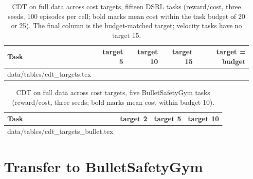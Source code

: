 \documentclass{article} %
\makeatletter
\newcommand{\tabinput}[1]{\@@input#1 }
\makeatother
\begin{document}
\begin{table}[h]
\caption{CDT on full data across cost targets, fifteen DSRL tasks (reward/cost, three seeds, 100 episodes per cell; bold marks mean cost within the task budget of 20 or 25). The final column is the budget-matched target; velocity tasks have no target 15.}
\label{tab:cdttargets}
\begin{center}
\scriptsize
\setlength{\tabcolsep}{4pt}
\begin{tabular}{l rrrr}
\toprule
Task & target 5 & target 10 & target 15 & target = budget \\
\midrule
\tabinput{data/tables/cdt_targets.tex}
\bottomrule
\end{tabular}
\end{center}
\end{table}

\begin{table}[h]
\caption{CDT on full data across cost targets, five BulletSafetyGym tasks (reward/cost, three seeds; bold marks mean cost within budget 10).}
\label{tab:cdttargetsb}
\begin{center}
\scriptsize
\setlength{\tabcolsep}{4pt}
\begin{tabular}{l rrr}
\toprule
Task & target 2 & target 5 & target 10 \\
\midrule
\tabinput{data/tables/cdt_targets_bullet.tex}
\bottomrule
\end{tabular}
\end{center}
\end{table}

\section{Transfer to BulletSafetyGym}
\label{app:bullet}
\end{document}
